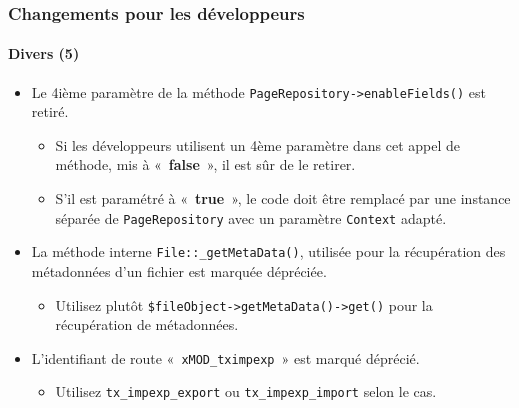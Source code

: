 \begin{frame}[fragile]
	\frametitle{Changements pour les développeurs}
	\framesubtitle{Divers (5)}

	\begin{itemize}

		\item Le 4ième paramètre de la méthode \texttt{PageRepository->enableFields()} est retiré.

		\begin{itemize}\smaller
			\item[\ding{228}] Si les développeurs utilisent un 4ème paramètre dans cet appel de méthode,
				mis à «~\textbf{false}~», il est sûr de le retirer.
			\item[\ding{228}] S'il est paramétré à «~\textbf{true}~», le code doit être remplacé par une
				instance séparée de \texttt{PageRepository} avec un paramètre \texttt{Context} adapté.
		\end{itemize}\normalsize

		\item La méthode interne \texttt{File::\_getMetaData()}, utilisée pour la récupération des
			métadonnées d'un fichier est marquée dépréciée.

			\begin{itemize}\smaller
				\item[\ding{228}] Utilisez plutôt \texttt{\$fileObject->getMetaData()->get()} pour la récupération de métadonnées.
			\end{itemize}\normalsize

		\item L'identifiant de route «~\texttt{xMOD\_tximpexp}~» est marqué déprécié.

			\begin{itemize}\smaller
				\item[\ding{228}] Utilisez \texttt{tx\_impexp\_export} ou \texttt{tx\_impexp\_import} selon le cas.
			\end{itemize}\normalsize

	\end{itemize}

\end{frame}


